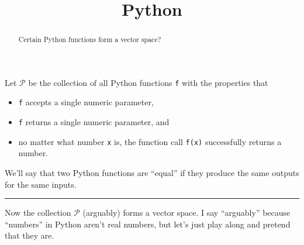 \documentclass{ximera}
\title{Python}
\begin{document}
\begin{abstract}
  Certain Python functions form a vector space?
\end{abstract}\maketitle

Let $\mathcal{P}$ be the collection of all Python functions \texttt{f} with the properties that
\begin{itemize}
\item \texttt{f} accepts a single numeric parameter,
\item \texttt{f} returns a single numeric parameter, and
\item no matter what number \texttt{x} is, the function call \texttt{f(x)} successfully returns a number.
\end{itemize}
We'll say that two Python functions are ``equal'' if they produce the same outputs for the same inputs.

\hrule

Now the collection $\mathcal{P}$ (arguably) forms a vector space.  I
say ``arguably'' because ``numbers'' in Python aren't real numbers,
but let's just play along and pretend that they are.
\end{document}
